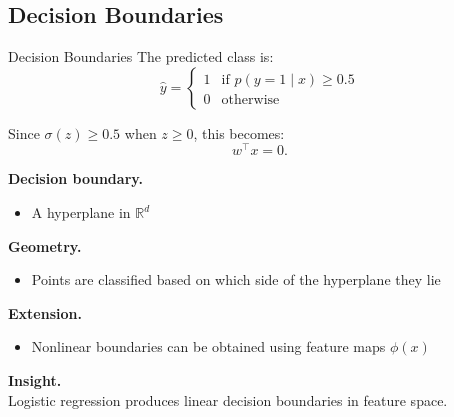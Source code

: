 \documentclass[aspectratio=169,11pt]{beamer}
\begin{document}
\subsection{Decision Boundaries}
\begin{frame}[t,allowframebreaks]{Decision Boundaries}
\small
The predicted class is:
\[
\hat{y} =
\begin{cases}
1 & \text{if } p(y=1 \mid x) \geq 0.5 \\
0 & \text{otherwise}
\end{cases}
\]

Since $\sigma(z) \geq 0.5$ when $z \geq 0$, this becomes:
\[
w^\top x = 0.
\]

\textbf{Decision boundary.}\\ \begin{itemize}
    \item A hyperplane in $\mathbb{R}^d$
\end{itemize}

\textbf{Geometry.}\\ \begin{itemize}
    \item Points are classified based on which side of the hyperplane they lie
\end{itemize}

\textbf{Extension.}\\ \begin{itemize}
    \item Nonlinear boundaries can be obtained using feature maps $\phi(x)$
\end{itemize}

\textbf{Insight.}\\ Logistic regression produces linear decision boundaries in feature space.
\end{frame}
\end{document}
